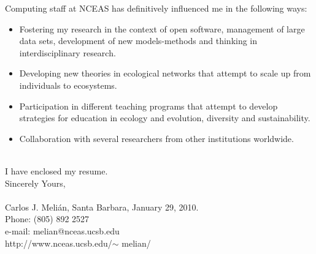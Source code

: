 \documentclass[a4paper,11pt]{letter}
\begin{document}
Computing staff at NCEAS has definitively influenced me in the following ways:
\begin{itemize}
\item Fostering my research in the context of open software,
  management of large data sets, development of new models-methods and
  thinking in interdisciplinary research.
\item Developing new theories in ecological networks that attempt to
  scale up from individuals to ecosystems.
\item Participation in different teaching programs that attempt to
  develop strategies for education in ecology and evolution, diversity
  and sustainability.
\item Collaboration with several researchers from other institutions
worldwide.
\end{itemize}
\\
I have enclosed my resume.
\\
Sincerely Yours,
\\
\\
Carlos J. Meli\'an,\hspace{1.75 in}  Santa Barbara, January 29, 2010.\\
Phone: (805) 892 2527\\
e-mail: melian@nceas.ucsb.edu\\
http://www.nceas.ucsb.edu/$\sim$ melian/\\
\end{document}
